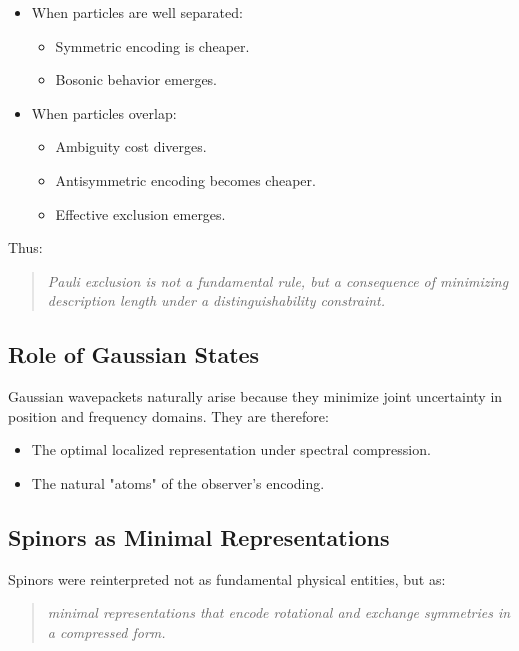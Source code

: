 \documentclass[11pt]{article}
\begin{document}
\begin{itemize}
    \item When particles are well separated:
    \begin{itemize}
        \item Symmetric encoding is cheaper.
        \item Bosonic behavior emerges.
    \end{itemize}

    \item When particles overlap:
    \begin{itemize}
        \item Ambiguity cost diverges.
        \item Antisymmetric encoding becomes cheaper.
        \item Effective exclusion emerges.
    \end{itemize}
\end{itemize}

Thus:

\begin{quote}
\emph{Pauli exclusion is not a fundamental rule, but a consequence of minimizing description length under a distinguishability constraint.}
\end{quote}

\subsection{Role of Gaussian States}

Gaussian wavepackets naturally arise because they minimize joint uncertainty in position and frequency domains. They are therefore:

\begin{itemize}
    \item The optimal localized representation under spectral compression.
    \item The natural "atoms" of the observer’s encoding.
\end{itemize}

\subsection{Spinors as Minimal Representations}

Spinors were reinterpreted not as fundamental physical entities, but as:

\begin{quote}
\emph{minimal representations that encode rotational and exchange symmetries in a compressed form.}
\end{quote}
\end{document}
